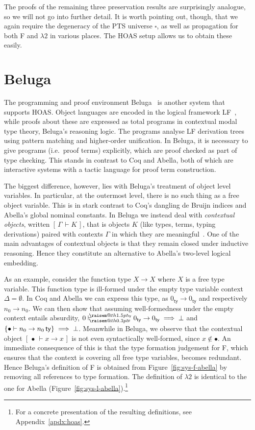 \documentclass[a4paper,UKenglish]{lipics-v2016}
\makeatletter
\newcommand{\ms}{\,}
\newcommand{\SysL}{$\lambda2$\xspace}
\newcommand{\ty}{\mathsf{ty}}
\newcommand{\raisemath}[1]{\mathpalette{\raisem@th{#1}}}
\newcommand{\raisem@th}[3]{\raisebox{#1}{\ensuremath{#2#3}}}
\newcommand{\tsAnnot}[2]{\vdash\hspace{-.7em}^{\raisemath{1.5pt}{\scriptscriptstyle{#2}}}_{\raisemath{0.3pt}{\scriptscriptstyle{#1}}}} %
\newcommand{\tfF}{\tsAnnot{\mathsf{F}}{\ty}}  %
\newcommand{\istyF}[2]{\ensuremath{{#1} \mathrel{\tfF} #2}}
\newcommand{\istyFh}[1]{\ensuremath{#1\ms\mathsf{ty}}}
\newcommand{\Typ}{\ensuremath{\square}}
\newcommand{\emptyctx}{\ensuremath{\bullet}}
\newcommand{\bc}[2]{\ensuremath{[\,#1\,\vdash #2\,]}}
\theoremstyle{plain}
\makeatother
\begin{document}
The proofs of the remaining three preservation results are surprisingly analogue, so we will not go into further detail.
It is worth pointing out, though, that we again require the degeneracy of the PTS universe $\Typ$, as well as propagation for both F and \SysL in various places.
The HOAS setup allows us to obtain these easily.

\section{Beluga}
\label{sec:beluga}

The programming and proof environment Beluga~\cite{Pientka:FLOPS10,Pientka:CADE15} is another system that supports HOAS.
Object languages are encoded in the logical framework LF~\cite{Harper93jacm}, while proofs about these are expressed as total programs in contextual modal type theory, Beluga's reasoning logic.
The programs analyse LF derivation trees using pattern matching and higher-order unification.
In Beluga, it is necessary to give programs (i.e.\ proof terms) explicitly, which are proof checked as part of type checking.
This stands in contrast to Coq and Abella, both of which are interactive systems with a tactic language for proof term construction.

The biggest difference, however, lies with Beluga's treatment of object level variables.
In particular, at the outermost level, there is no such thing as a free object variable.
This is in stark contrast to Coq's dangling de Bruijn indices and Abella's global nominal constants.
In Beluga we instead deal with \emph{contextual objects}, written $\bc{\Gamma}{K}$, that is objects $K$ (like types, terms, typing derivations) paired with contexts $\Gamma$ in which they are meaningful~\cite{Nanevski:ICML05,Pientka:POPL08}.
One of the main advantages of contextual objects is that they remain closed under inductive reasoning.
Hence they constitute an alternative to Abella's two-level logical embedding.

As an example, consider the function type $X \to X$ where $X$ is a free type variable.
This function type is ill-formed under the empty type variable context $\Delta = \emptyset$.
In Coq and Abella we can express this type, as $0_\ty \to 0_\ty$ and respectively $n_0 \to n_0$.
We can then show that assuming well-formedness under the empty context entails absurdity, $\istyF{0}{0_\ty \to 0_\ty} \implies \bot$ and $\aj{\emptyctx}{\istyFh{n_0 \to n_0}} \implies \bot$.
Meanwhile in Beluga, we observe that the contextual object $\bc{\emptyctx}{x \to x}$ is not even syntactically well-formed, since $x \notin \emptyctx$.
An immediate consequence of this is that the type formation judgement for F, which ensures that the context is covering all free type variables, becomes redundant.
Hence Beluga's definition of F is obtained from Figure~\ref{fig:sys-f-abella} by removing all references to type formation.
The definition of \SysL is identical to the one for Abella (Figure~\ref{fig:sys-l-abella}).\footnote{For a concrete presentation of the resulting definitions, see Appendix~\ref{apdx:hoas}.}
\end{document}
